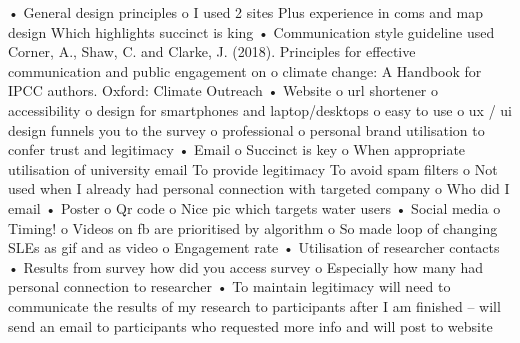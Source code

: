 •	General design principles
o	 I used 2 sites 
Plus experience in coms and map design
Which highlights succinct is king
•	Communication style guideline used
Corner, A., Shaw, C. and Clarke, J. (2018). Principles for effective communication and public engagement on
o	climate change: A Handbook for IPCC authors. Oxford: Climate Outreach 
•	Website 
o	url shortener
o	accessibility
o	design for smartphones and laptop/desktops
o	easy to use
o	ux / ui design funnels you to the survey
o	professional 
o	personal brand utilisation to confer trust and legitimacy
•	Email
o	 Succinct is key
o	When appropriate utilisation of university email
	To provide legitimacy
	To avoid spam filters
o	Not used when I already had personal connection with targeted company
o	Who did I email 
•	Poster
o	Qr code
o	Nice pic which targets water users
•	Social media
o	Timing!
o	Videos on fb are prioritised by algorithm
o	So made loop of changing SLEs as gif and as video
o	Engagement rate
•	Utilisation of researcher contacts
•	Results from survey how did you access survey
o	Especially how many had personal connection to researcher
•	To maintain legitimacy will need to communicate the results of my research to participants after I am finished – will send an email to participants who requested more info and will post to website 


